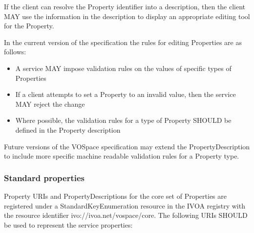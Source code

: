 \documentclass[11pt,a4paper]{ivoa}
\begin{document}
If the client can resolve the Property identifier into a description, then the client MAY use the information in the description to display an appropriate editing tool for the Property.

In the current version of the specification the rules for editing Properties are as follows:

\begin{itemize}
    \item A service MAY impose validation rules on the values of specific types of Properties
    \item If a client attempts to set a Property to an invalid value, then the service MAY reject the change
    \item Where possible, the validation rules for a type of Property SHOULD be defined in the Property description
\end{itemize}

Future versions of the VOSpace specification may extend the PropertyDescription to include more specific machine readable validation rules for a Property type.

\subsubsection{Standard properties}
\label{subsubsec:standard properties}
Property URIs and PropertyDescriptions for the core set of Properties are registered under a StandardKeyEnumeration resource \citep{std:STDREGEXT} in the IVOA registry with the resource identifier ivo://ivoa.net/vospace/core. The following URIs SHOULD be used to represent the service properties:
\end{document}
